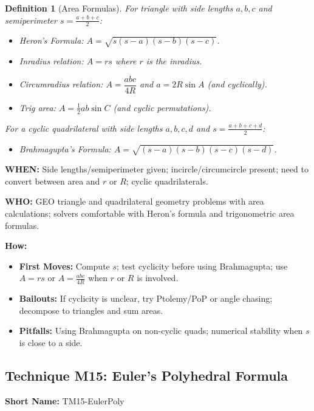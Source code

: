 \documentclass[12pt]{article}
\newtheorem{definition}{Definition}[section]
\begin{document}
\begin{definition}[Area Formulas]
For triangle with side lengths $a,b,c$ and semiperimeter $s=\tfrac{a+b+c}{2}$:
\begin{itemize}
    \item Heron's Formula: $A=\sqrt{s(s-a)(s-b)(s-c)}$.
    \item Inradius relation: $A = r s$ where $r$ is the inradius.
    \item Circumradius relation: $A = \dfrac{abc}{4R}$ and $a=2R\sin A$ (and cyclically).
    \item Trig area: $A=\tfrac{1}{2}ab\sin C$ (and cyclic permutations).
\end{itemize}
For a cyclic quadrilateral with side lengths $a,b,c,d$ and $s=\tfrac{a+b+c+d}{2}$:
\begin{itemize}
    \item Brahmagupta's Formula: $A=\sqrt{(s-a)(s-b)(s-c)(s-d)}$.
\end{itemize}
\end{definition}

\textbf{WHEN:} Side lengths/semiperimeter given; incircle/circumcircle present; need to convert between area and $r$ or $R$; cyclic quadrilaterals.

\textbf{WHO:} GEO triangle and quadrilateral geometry problems with area calculations; solvers comfortable with Heron's formula and trigonometric area formulas.

\textbf{How:}
\begin{itemize}
    \item \textbf{First Moves:} Compute $s$; test cyclicity before using Brahmagupta; use $A=rs$ or $A=\tfrac{abc}{4R}$ when $r$ or $R$ is involved.
    \item \textbf{Bailouts:} If cyclicity is unclear, try Ptolemy/PoP or angle chasing; decompose to triangles and sum areas.
    \item \textbf{Pitfalls:} Using Brahmagupta on non-cyclic quads; numerical stability when $s$ is close to a side.
\end{itemize}



\subsection{Technique M15: Euler's Polyhedral Formula}
\textbf{Short Name:} TM15-EulerPoly
\end{document}
